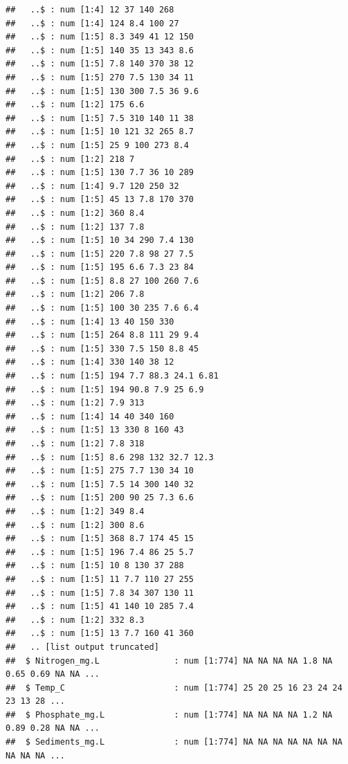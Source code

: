 \documentclass[
  12pt,
]{article}
\begin{document}
\begin{verbatim}
##   ..$ : num [1:4] 12 37 140 268
##   ..$ : num [1:4] 124 8.4 100 27
##   ..$ : num [1:5] 8.3 349 41 12 150
##   ..$ : num [1:5] 140 35 13 343 8.6
##   ..$ : num [1:5] 7.8 140 370 38 12
##   ..$ : num [1:5] 270 7.5 130 34 11
##   ..$ : num [1:5] 130 300 7.5 36 9.6
##   ..$ : num [1:2] 175 6.6
##   ..$ : num [1:5] 7.5 310 140 11 38
##   ..$ : num [1:5] 10 121 32 265 8.7
##   ..$ : num [1:5] 25 9 100 273 8.4
##   ..$ : num [1:2] 218 7
##   ..$ : num [1:5] 130 7.7 36 10 289
##   ..$ : num [1:4] 9.7 120 250 32
##   ..$ : num [1:5] 45 13 7.8 170 370
##   ..$ : num [1:2] 360 8.4
##   ..$ : num [1:2] 137 7.8
##   ..$ : num [1:5] 10 34 290 7.4 130
##   ..$ : num [1:5] 220 7.8 98 27 7.5
##   ..$ : num [1:5] 195 6.6 7.3 23 84
##   ..$ : num [1:5] 8.8 27 100 260 7.6
##   ..$ : num [1:2] 206 7.8
##   ..$ : num [1:5] 100 30 235 7.6 6.4
##   ..$ : num [1:4] 13 40 150 330
##   ..$ : num [1:5] 264 8.8 111 29 9.4
##   ..$ : num [1:5] 330 7.5 150 8.8 45
##   ..$ : num [1:4] 330 140 38 12
##   ..$ : num [1:5] 194 7.7 88.3 24.1 6.81
##   ..$ : num [1:5] 194 90.8 7.9 25 6.9
##   ..$ : num [1:2] 7.9 313
##   ..$ : num [1:4] 14 40 340 160
##   ..$ : num [1:5] 13 330 8 160 43
##   ..$ : num [1:2] 7.8 318
##   ..$ : num [1:5] 8.6 298 132 32.7 12.3
##   ..$ : num [1:5] 275 7.7 130 34 10
##   ..$ : num [1:5] 7.5 14 300 140 32
##   ..$ : num [1:5] 200 90 25 7.3 6.6
##   ..$ : num [1:2] 349 8.4
##   ..$ : num [1:2] 300 8.6
##   ..$ : num [1:5] 368 8.7 174 45 15
##   ..$ : num [1:5] 196 7.4 86 25 5.7
##   ..$ : num [1:5] 10 8 130 37 288
##   ..$ : num [1:5] 11 7.7 110 27 255
##   ..$ : num [1:5] 7.8 34 307 130 11
##   ..$ : num [1:5] 41 140 10 285 7.4
##   ..$ : num [1:2] 332 8.3
##   ..$ : num [1:5] 13 7.7 160 41 360
##   .. [list output truncated]
##  $ Nitrogen_mg.L               : num [1:774] NA NA NA NA 1.8 NA 0.65 0.69 NA NA ...
##  $ Temp_C                      : num [1:774] 25 20 25 16 23 24 24 23 13 28 ...
##  $ Phosphate_mg.L              : num [1:774] NA NA NA NA 1.2 NA 0.89 0.28 NA NA ...
##  $ Sediments_mg.L              : num [1:774] NA NA NA NA NA NA NA NA NA NA ...
\end{verbatim}
\end{document}
